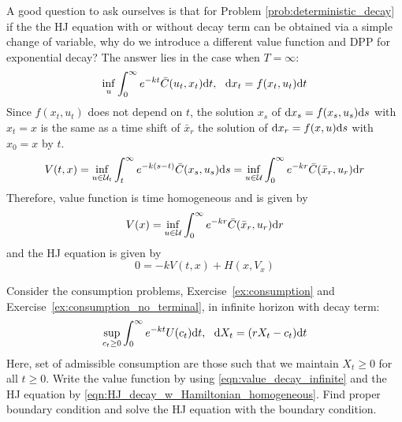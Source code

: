 \documentclass[11pt]{book}
\newcommand{\dd}{\text{\normalfont d}}
\newcommand{\dt}{\text{\normalfont d}t}
\newcommand{\ds}{\text{\normalfont d}s}
\newcommand{\dr}{\text{\normalfont d}r}
\newcommand{\dx}{\text{\normalfont d}x}
\begin{document}
    A good question to ask ourselves is that for Problem \eqref{prob:deterministic_decay} if the the HJ equation with or without decay term can be obtained via a simple change of variable, why do we introduce a different value function and DPP for exponential decay?
    The answer lies in the case when $T=\infty$:
    \begin{equation}
    \label{prob:deterministic_decay_infinite}
        \inf_{u}\int_0^\infty e^{-k t}\bar{C}(u_t,x_t)\dt ,~~\dx_t=f(x_t,u_t)\dt
    \end{equation}
    Since $f(x_t,u_t)$ does not depend on $t$, the solution $x_s$ of ${\dx}_s=f(x_s,u_s){\ds}$ with $x_t=x$ is the same as a time shift of $\bar{x}_r$ the solution of ${\dx}_r=f(x,u){\ds}$ with $x_0=x$ by $t$.
    \[
        V(t,x)= \inf_{u\in\mathcal{U}_{t}}\int_t^\infty e^{-k(s-t)}\bar{C}(x_s,u_s){{\ds}}=\inf_{u\in\mathcal{U}}\int_0^\infty e^{-kr}\bar{C}(\bar{x}_{r},u_{r}){{\dr}}
    \]
    Therefore, value function is time homogeneous
    and is given by
    \begin{equation} \label{eqn:value_decay_infinite}
    V(x)=\inf_{u\in\mathcal{U}}\int_0^\infty e^{-kr}\bar{C}(\bar{x}_{r},u_{r}){{\dr}}
    \end{equation}
    and the HJ equation is given by 
    \begin{equation} \label{eqn:HJ_decay_w_Hamiltonian_homogeneous}
                0=- k V(t,x)+H(x,V_x)            
    \end{equation}

    \begin{ex}
    Consider the consumption problems, Exercise~\ref{ex:consumption} and Exercise~\ref{ex:consumption_no_terminal}, in infinite horizon with decay term:
    \[
        {\sup_{c_t\ge0}}\int_0^\infty e^{-kt}U(c_t)\dt,~~\dd{X}_t = (rX_t - c_t)\dt
    \]
    Here, set of admissible consumption are those such that we maintain $X_t\ge0$ for all $t\ge0$. Write the value function by using \eqref{eqn:value_decay_infinite} and the HJ equation by \eqref{eqn:HJ_decay_w_Hamiltonian_homogeneous}. Find proper boundary condition and solve the HJ equation with the boundary condition.
    \end{ex}
        
\end{document}

